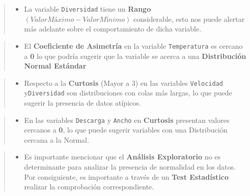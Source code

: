 \documentclass[
  10pt,
  letterpaper,
  DIV=11,
  numbers=noendperiod]{scrreprt}
\providecommand{\tightlist}{%
  \setlength{\itemsep}{0pt}\setlength{\parskip}{0pt}}\usepackage{longtable,booktabs,array}
\begin{document}
\begin{quote}
\begin{itemize}
\tightlist
\item
  La variable \texttt{Diversidad} tiene un \textbf{Rango}
  \((Valor Máximo - Valor Mínimo)\) considerable, esto nos puede alertar
  más adelante sobre el comportamiento de dicha variable.
\end{itemize}
\end{quote}

\begin{quote}
\begin{itemize}
\tightlist
\item
  El \textbf{Coeficiente de Asimetría} en la variable
  \texttt{Temperatura} es cercano a \textbf{0} lo que podría sugerir que
  la variable se acerca a una \textbf{Distribución Normal Estándar}
\end{itemize}
\end{quote}

\begin{quote}
\begin{itemize}
\tightlist
\item
  Respecto a la \textbf{Curtosis} (Mayor a 3) en las variables
  \texttt{Velocidad} y\texttt{Diversidad} son distribuciones con colas
  más largas, lo que puede sugerir la presencia de datos atípicos.
\end{itemize}
\end{quote}

\begin{quote}
\begin{itemize}
\tightlist
\item
  En las variables \texttt{Descarga} y \texttt{Ancho} en
  \textbf{Curtosis} presentan valores cercanos a \textbf{0}, lo que
  puede sugerir variables con una Distribución cercana a la Normal.
\end{itemize}
\end{quote}

\begin{quote}
\begin{itemize}
\tightlist
\item
  Es importante mencionar que el \textbf{Análisis Exploratorio} no es
  determinante para analizar la presencia de normalidad en los datos.
  Por consiguiente, es importante a través de un \textbf{Test
  Estadístico} realizar la comprobación correspondiente.
\end{itemize}
\end{quote}
\end{document}
